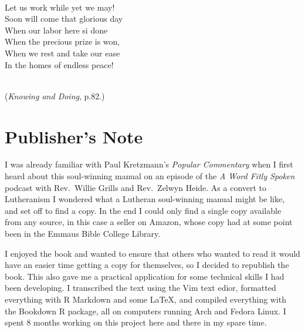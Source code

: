 \documentclass[
]{book}
\begin{document}
\strut \\
\hspace*{0.333em}\hspace*{0.333em}Let us work while yet we may!\\
\hspace*{0.333em}\hspace*{0.333em}Soon will come that glorious day\\
\hspace*{0.333em}\hspace*{0.333em}When our labor here si done\\
\hspace*{0.333em}\hspace*{0.333em}When the precious prize is won,\\
\hspace*{0.333em}\hspace*{0.333em}When we rest and take our ease\\
\hspace*{0.333em}\hspace*{0.333em}In the homes of endless peace!\\
\strut \\
\hspace*{0.333em}\hspace*{0.333em}(\emph{Knowing and Doing}, p.82.)

\chapter*{Publisher's Note}\label{publishers-note}

I was already familiar with Paul Kretzmann's \emph{Popular Commentary} when I first heard about this soul-winning manual on an episode of the \emph{A Word Fitly Spoken} podcast with Rev.~Willie Grills and Rev.~Zelwyn Heide. As a convert to Lutheranism I wondered what a Lutheran soul-winning manual might be like, and set off to find a copy. In the end I could only find a single copy available from any source, in this case a seller on Amazon, whose copy had at some point been in the Emmaus Bible College Library.

I enjoyed the book and wanted to ensure that others who wanted to read it would have an easier time getting a copy for themselves, so I decided to republish the book. This also gave me a practical application for some technical skills I had been developing. I transcribed the text using the Vim text edior, formatted everything with R Markdown and some \LaTeX, and compiled everything with the Bookdown R package, all on computers running Arch and Fedora Linux. I spent 8 months working on this project here and there in my spare time.
\end{document}
